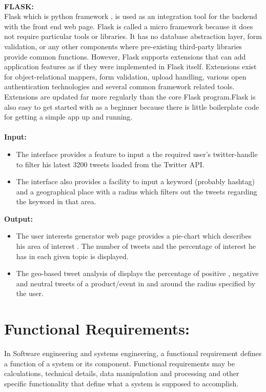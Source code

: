 \paragraph{}
\indent 
\textbf{FLASK:} \\
Flask which is python framework , is used as an integration tool for the backend with the front end web page. Flask is called a micro framework because it does not require particular tools or libraries. It has no database abstraction layer, form validation, or any other components where pre-existing third-party libraries provide common functions. However, Flask supports extensions that can add application features as if they were implemented in Flask itself. Extensions exist for object-relational mappers, form validation, upload handling, various open authentication technologies and several common framework related tools. Extensions are updated far more regularly than the core Flask program.Flask is also easy to get started with as a beginner because there is little boilerplate code for getting a simple app up and running. 
\\ \\
\textbf{Input:}
\begin{itemize}
\item The interface provides a feature to input a the required user's twitter-handle to filter his latest 3200 tweets loaded from the Twitter API.
\item The interface also provides a facility to input a keyword (probably hashtag)
and a geographical place with a radius which filters out the tweets regarding the keyword in that area.
\end{itemize}
\textbf{Output:}
\begin{itemize}
\item The user interests generator web page provides a pie-chart which describes his area of interest . The number of tweets and the percentage of interest he has in each given topic is displayed.
\item The geo-based tweet analysis of displays the percentage of positive , negative and neutral tweets of a product/event in and around the radius specified by the user.
\end{itemize}

\section{Functional Requirements:}
In Software engineering and systems engineering, a functional requirement defines
a function of a system or its component. Functional requirements may be calculations,
technical details, data manipulation and processing and other specific functionality that
define what a system is supposed to accomplish.
